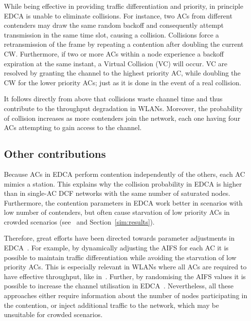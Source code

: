 While being effective in providing traffic differentiation and priority, in principle EDCA is unable to eliminate collisions. For instance, two ACs from different contenders may draw the same random backoff and consequently attempt transmission in the same time slot, causing a collision. Collisions force a retransmission of the frame by repeating a contention after doubling the current CW. Furthermore, if two or more ACs within a node experience a backoff expiration at the same instant, a Virtual Collision (VC) will occur. VC are resolved by granting the channel to the highest priority AC, while doubling the CW for the lower priority ACs; just as it is done in the event of a real collision.

It follows directly from above that collisions waste channel time and thus contribute to the throughput degradation in WLANs. Moreover, the probability of collision increases as more contenders join the network, each one having four ACs attempting to gain access to the channel.

\subsection{Other contributions}
Because ACs in EDCA perform contention independently of the others, each AC mimics a station. This explains why the collision probability in EDCA is higher than in single-AC DCF networks with the same number of saturated nodes. Furthermore, the contention parameters in EDCA work better in scenarios with low number of contenders, but often cause starvation of low priority ACs in crowded scenarios (see~\cite{990806} and Section~\ref{sim:results}).

Therefore, great efforts have been directed towards parameter adjustments in EDCA~\cite{throughputGuarantees,6614899,4594854}. For example, by dynamically adjusting the AIFS for each AC it is possible to maintain traffic differentiation while avoiding the starvation of low priority ACs. This is especially relevant in WLANs where all ACs are required to have effective throughput, like in~\cite{6614899}. Further, by randomising the AIFS values it is possible to increase the channel utilisation in EDCA~\cite{4594854}. Nevertheless, all these approaches either require information about the number of nodes participating in the contention, or inject additional traffic to the network, which may be unsuitable for crowded scenarios.
